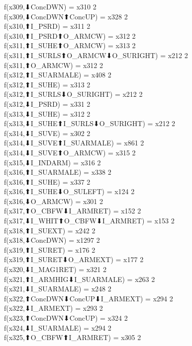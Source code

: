f(x309,⬇ConcDWN) = x310 {2} \\
f(x309,⬇ConcDWN⬆ConcUP) = x328 {2} \\
f(x310,⬆I_PSRD) = x311 {2} \\
f(x310,⬆I_PSRD⬆O_ARMCW) = x312 {2} \\
f(x311,⬆I_SUHE⬆O_ARMCW) = x313 {2} \\
f(x311,⬆I_SURLS⬆O_ARMCW⬇O_SURIGHT) = x212 {2} \\
f(x311,⬆O_ARMCW) = x312 {2} \\
f(x312,⬆I_SUARMALE) = x408 {2} \\
f(x312,⬆I_SUHE) = x313 {2} \\
f(x312,⬆I_SURLS⬇O_SURIGHT) = x212 {2} \\
f(x312,⬇I_PSRD) = x331 {2} \\
f(x313,⬇I_SUHE) = x312 {2} \\
f(x313,⬇I_SUHE⬆I_SURLS⬇O_SURIGHT) = x212 {2} \\
f(x314,⬇I_SUVE) = x302 {2} \\
f(x314,⬇I_SUVE⬆I_SUARMALE) = x861 {2} \\
f(x314,⬇I_SUVE⬆O_ARMCW) = x315 {2} \\
f(x315,⬇I_INDARM) = x316 {2} \\
f(x316,⬆I_SUARMALE) = x338 {2} \\
f(x316,⬆I_SUHE) = x337 {2} \\
f(x316,⬆I_SUHE⬇O_SULEFT) = x124 {2} \\
f(x316,⬇O_ARMCW) = x301 {2} \\
f(x317,⬆O_CBFW⬇I_ARMRET) = x152 {2} \\
f(x317,⬇I_WHIT⬆O_CBFW⬇I_ARMRET) = x153 {2} \\
f(x318,⬆I_SUEXT) = x242 {2} \\
f(x318,⬇ConcDWN) = x1297 {2} \\
f(x319,⬆I_SURET) = x176 {2} \\
f(x319,⬆I_SURET⬇O_ARMEXT) = x177 {2} \\
f(x320,⬇I_MAG1RET) = x321 {2} \\
f(x321,⬆I_ARMHIG⬇I_SUARMALE) = x263 {2} \\
f(x321,⬇I_SUARMALE) = x248 {2} \\
f(x322,⬆ConcDWN⬇ConcUP⬇I_ARMEXT) = x294 {2} \\
f(x322,⬇I_ARMEXT) = x293 {2} \\
f(x323,⬆ConcDWN⬇ConcUP) = x324 {2} \\
f(x324,⬇I_SUARMALE) = x294 {2} \\
f(x325,⬆O_CBFW⬆I_ARMRET) = x305 {2} \\
